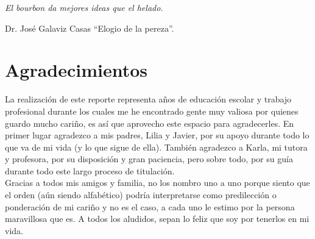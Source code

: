 \thispagestyle{empty}
\vspace*{250px}
\begin{flushright}
	\begin{Large}
		\textit{El bourbon da mejores ideas que el helado.}\\
	\end{Large}
Dr. José Galaviz Casas ``Elogio de la pereza''.
\end{flushright}
\clearpage

\chapter*{Agradecimientos}
\thispagestyle{empty}
\noindent La realización de este reporte representa años de educación escolar y trabajo profesional durante los cuales me he encontrado gente muy valiosa por quienes guardo mucho cariño, es así que aprovecho este espacio para agradecerles. En primer lugar agradezco a mis padres, Lilia y Javier, por su apoyo durante todo lo que va de mi vida (y lo que sigue de ella). También agradezco a Karla, mi tutora y profesora, por su disposición y gran paciencia, pero sobre todo, por su guía durante todo este largo proceso de titulación.\\
\indent Gracias a todos mis amigos y familia, no los nombro uno a uno porque siento que el orden (aún siendo alfabético) podría interpretarse como predilección o ponderación de mi cariño y no es el caso, a cada uno le estimo por la persona maravillosa que es. A todos los aludidos, sepan lo feliz que soy por tenerlos en mi vida.
\clearpage